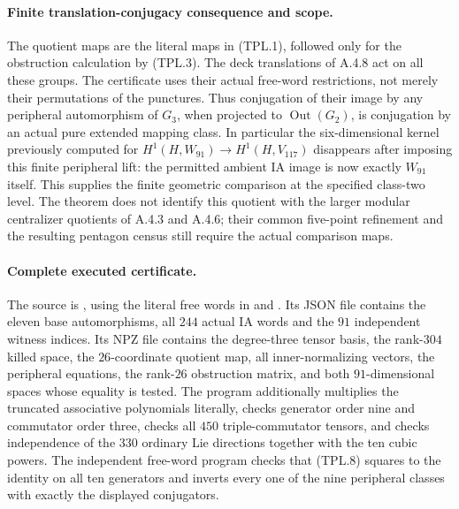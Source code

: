 \paragraph{Finite translation-conjugacy consequence and scope.}
The quotient maps are the literal maps in (TPL.1), followed
only for the obstruction calculation by (TPL.3).
The deck translations of A.4.8 act on all these groups.
The certificate uses their actual free-word restrictions,
not merely their permutations of the punctures.
Thus conjugation of their image by any peripheral
automorphism of $G_3$, when projected to
$\operatorname{Out}(G_2)$, is conjugation by an actual pure
extended mapping class.  In particular the six-dimensional
kernel previously computed for
$H^1(H,W_{91})\to H^1(H,V_{117})$ disappears after imposing
this finite peripheral lift: the permitted ambient IA image
is now exactly $W_{91}$ itself.
This supplies the finite geometric comparison at the specified
class-two level.  The theorem does not identify this quotient
with the larger modular centralizer quotients of A.4.3 and
A.4.6; their common five-point refinement and the resulting
pentagon census still require the actual comparison maps.

\paragraph{Complete executed certificate.}
The source is , using
the literal free words in 
and .
Its JSON file contains the eleven base automorphisms, all
$244$ actual IA words and the $91$ independent witness
indices.  Its NPZ file contains the degree-three tensor
basis, the rank-$304$ killed space, the $26$-coordinate
quotient map, all inner-normalizing vectors, the peripheral
equations, the rank-$26$ obstruction matrix, and both
$91$-dimensional spaces whose equality is tested.
The program additionally multiplies the truncated associative
polynomials literally, checks generator order nine and
commutator order three, checks all $450$ triple-commutator
tensors, and checks independence of the $330$ ordinary Lie
directions together with the ten cubic powers.
The independent free-word program
 checks that
(TPL.8) squares to the identity on all ten generators and
inverts every one of the nine peripheral classes with exactly
the displayed conjugators.
